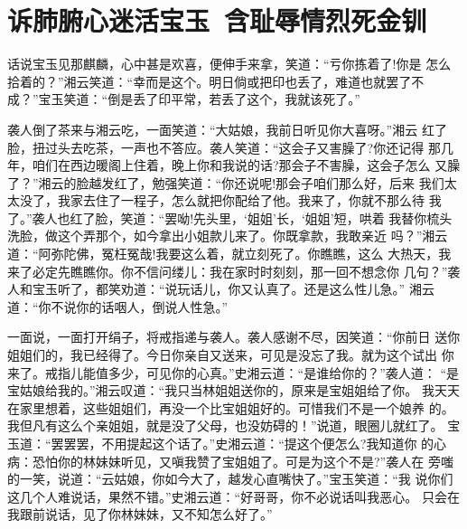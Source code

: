 \chapter{诉肺腑心迷活宝玉~含耻辱情烈死金钏}

话说宝玉见那麒麟，心中甚是欢喜，便伸手来拿，笑道：“亏你拣着了!你是
怎么拾着的？”湘云笑道：“幸而是这个。明日倘或把印也丢了，难道也就罢了不
成？”宝玉笑道：“倒是丢了印平常，若丢了这个，我就该死了。”

袭人倒了茶来与湘云吃，一面笑道：“大姑娘，我前日听见你大喜呀。”湘云
红了脸，扭过头去吃茶，一声也不答应。袭人笑道：“这会子又害臊了?你还记得
那几年，咱们在西边暖阁上住着，晚上你和我说的话?那会子不害臊，这会子怎么
又臊了？”湘云的脸越发红了，勉强笑道：“你还说呢!那会子咱们那么好，后来
我们太太没了，我家去住了一程子，怎么就把你配给了他。我来了，你就不那么待
我了。”袭人也红了脸，笑道：“罢呦!先头里，‘姐姐’长，‘姐姐’短，哄着
我替你梳头洗脸，做这个弄那个，如今拿出小姐款儿来了。你既拿款，我敢亲近
吗？”湘云道：“阿弥陀佛，冤枉冤哉!我要这么着，就立刻死了。你瞧瞧，这么
大热天，我来了必定先瞧瞧你。你不信问缕儿：我在家时时刻刻，那一回不想念你
几句？”袭人和宝玉听了，都笑劝道：“说玩话儿，你又认真了。还是这么性儿急。”
湘云道：“你不说你的话咽人，倒说人性急。”

一面说，一面打开绢子，将戒指递与袭人。袭人感谢不尽，因笑道：“你前日
送你姐姐们的，我已经得了。今日你亲自又送来，可见是没忘了我。就为这个试出
你来了。戒指儿能值多少，可见你的心真。”史湘云道：“是谁给你的？”袭人道：
“是宝姑娘给我的。”湘云叹道：“我只当林姐姐送你的，原来是宝姐姐给了你。
我天天在家里想着，这些姐姐们，再没一个比宝姐姐好的。可惜我们不是一个娘养
的。我但凡有这么个亲姐姐，就是没了父母，也没妨碍的！”说道，眼圈儿就红了。
宝玉道：“罢罢罢，不用提起这个话了。”史湘云道：“提这个便怎么?我知道你
的心病：恐怕你的林妹妹听见，又嗔我赞了宝姐姐了。可是为这个不是?”袭人在
旁嗤的一笑，说道：“云姑娘，你如今大了，越发心直嘴快了。”宝玉笑道：“我
说你们这几个人难说话，果然不错。”史湘云道：“好哥哥，你不必说话叫我恶心。
只会在我跟前说话，见了你林妹妹，又不知怎么好了。”

